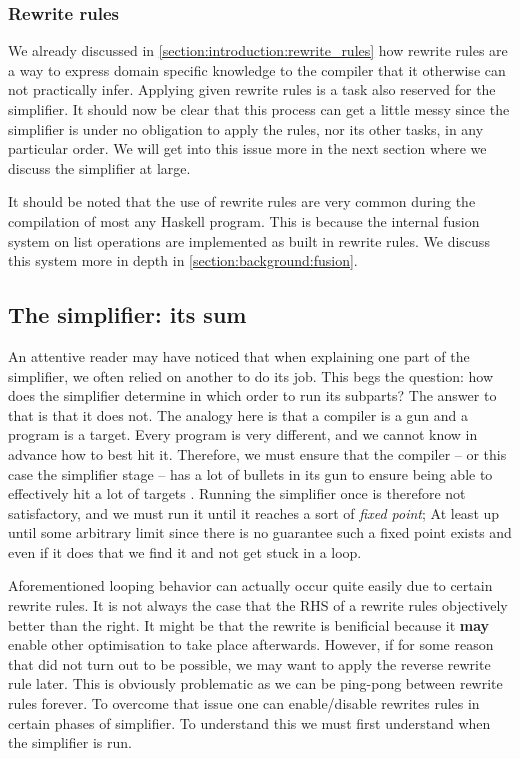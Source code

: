 \subsubsection{Rewrite rules}

We already discussed in \cref{section:introduction:rewrite_rules} how rewrite rules are a way to express domain
specific knowledge to the compiler that it otherwise can not practically infer. Applying given rewrite rules is a task
also reserved for the simplifier. It should now be clear that this process can get a little messy since the simplifier
is under no obligation to apply the rules, nor its other tasks, in any particular order. We will get into this issue
more in the next section where we discuss the simplifier at large.

It should be noted that the use of rewrite rules are very common during the compilation of most any Haskell program.
This is because the internal fusion system on list operations are implemented as built in rewrite rules.
We discuss this system more in depth in \cref{section:background:fusion}.

\subsection{The simplifier: its sum}

An attentive reader may have noticed that when explaining one part of the simplifier, we often relied on another to do
its job. This begs the question: how does the simplifier determine in which order to run its subparts? The answer to that is
that it does not. The analogy here is that a compiler is a gun and a program is a target. Every program is very different,
and we cannot know in advance how to best hit it. Therefore, we must ensure that the compiler -- or this case the simplifier stage --
has a lot of bullets in its gun to ensure being able to effectively hit a lot of targets \cite{haskell_optimisations_1997}.
Running the simplifier once is therefore not satisfactory, and we must run it until it reaches a sort of \textit{fixed point}; At least up until some
arbitrary limit since there is no guarantee such a fixed point exists and even if it does that we find it and not get stuck in a loop.

Aforementioned looping behavior can actually occur quite easily due to certain rewrite rules. It is not always the case that
the RHS of a rewrite rules objectively better than the right. It might be that the rewrite is benificial because it \textbf{may}
enable other optimisation to take place afterwards. However, if for some reason that did not turn out to be possible, we may want
to apply the reverse rewrite rule later. This is obviously problematic as we can be ping-pong between rewrite rules forever.
To overcome that issue one can enable/disable rewrites rules in certain phases of simplifier. To understand this we must first
understand when the simplifier is run.

